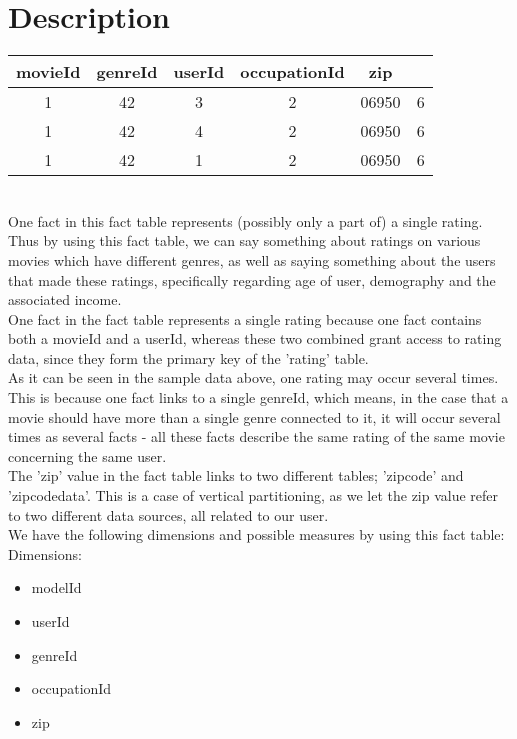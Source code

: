\section*{Description}

\begin{tabular}{ c | c | c | c | c | c }
  movieId & genreId & userId & occupationId & zip \\
  \hline
  1 & 42 & 3 & 2 & 06950 & 6 \\
  1 & 42 & 4 & 2 & 06950 & 6 \\
  1 & 42 & 1 & 2 & 06950 & 6 \\
  \hline  
\end{tabular} \\

\noindent One fact in this fact table represents (possibly only a part of) a single rating. Thus by using this fact table, we can say something about ratings on various movies which have different genres, as well as saying something about the users that made these ratings, specifically regarding age of user, demography and the associated income. \\
One fact in the fact table represents a single rating because one fact contains both a movieId and a userId, whereas these two combined grant access to rating data, since they form the primary key of the 'rating' table. \\
As it can be seen in the sample data above, one rating may occur several times. This is because one fact links to a single genreId, which means, in the case that a movie should have more than a single genre connected to it, it will occur several times as several facts - all these facts describe the same rating of the same movie concerning the same user. \\
The 'zip' value in the fact table links to two different tables; 'zipcode' and 'zipcodedata'. This is a case of vertical partitioning, as we let the zip value refer to two different data sources, all related to our user. \\

\noindent We have the following dimensions and possible measures by using this fact table: \\
Dimensions:

\begin{itemize}
  \item modelId
  \item userId
  \item genreId
  \item occupationId
  \item zip
\end{itemize}

